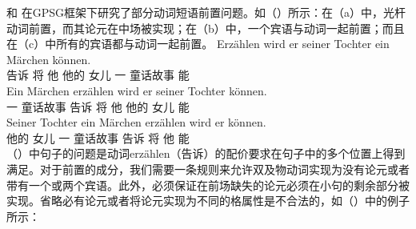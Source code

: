  \citet{Nerbonne86a}和 \citet{Johnson86a}在GPSG框架下研究了部分动词短语前置问题。如（）所示：在（a）中，光杆动词前置，而其论元在中场被实现；在（b）中，一个宾语与动词一起前置；而且在（c）中所有的宾语都与动词一起前置。
\eal
\ex 
\gll Erzählen wird er seiner Tochter ein Märchen können.\\
     告诉  将 他 他的 女儿 一 童话故事 能\\
\ex 
\gll Ein Märchen erzählen wird er seiner Tochter können.\\
     一 童话故事 告诉 将 他 他的 女儿 能\\
\ex 
\gll Seiner Tochter ein Märchen erzählen wird er können.\\
     他的 女儿 一 童话故事 告诉 将 他 能\\
\zl
（）中句子的问题是动词erzählen（告诉）的配价要求在句子中的多个位置上得到满足。对于前置的成分，我们需要一条规则来允许双及物动词实现为没有论元或者带有一个或两个宾语。此外，必须保证在前场缺失的论元必须在小句的剩余部分被实现。省略必有论元或者将论元实现为不同的格属性是不合法的，如（）中的例子所示：
\eal
{}
